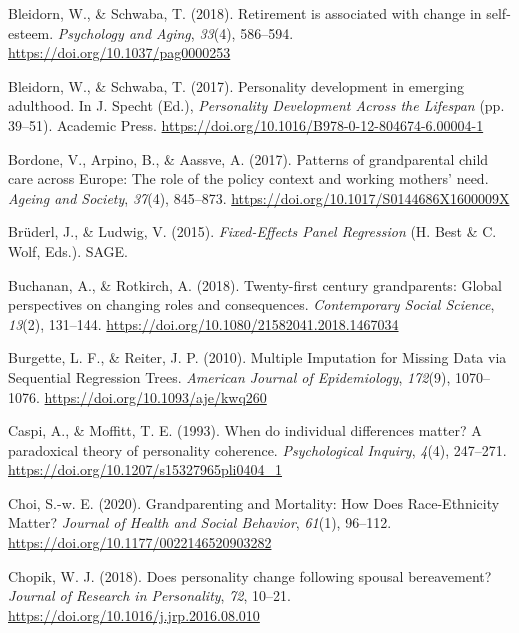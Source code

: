 \documentclass[
  english,
  man, noextraspace]{apa7}
\begin{document}
\leavevmode\hypertarget{ref-bleidornRetirementAssociatedChange2018}{}%
Bleidorn, W., \& Schwaba, T. (2018). Retirement is associated with change in self-esteem. \emph{Psychology and Aging}, \emph{33}(4), 586--594. \url{https://doi.org/10.1037/pag0000253}

\leavevmode\hypertarget{ref-bleidornPersonalityDevelopmentEmerging2017}{}%
Bleidorn, W., \& Schwaba, T. (2017). Personality development in emerging adulthood. In J. Specht (Ed.), \emph{Personality Development Across the Lifespan} (pp. 39--51). Academic Press. \url{https://doi.org/10.1016/B978-0-12-804674-6.00004-1}

\leavevmode\hypertarget{ref-bordonePatternsGrandparentalChild2017}{}%
Bordone, V., Arpino, B., \& Aassve, A. (2017). Patterns of grandparental child care across Europe: The role of the policy context and working mothers' need. \emph{Ageing and Society}, \emph{37}(4), 845--873. \url{https://doi.org/10.1017/S0144686X1600009X}

\leavevmode\hypertarget{ref-bruderlFixedEffectsPanelRegression2015}{}%
Brüderl, J., \& Ludwig, V. (2015). \emph{Fixed-Effects Panel Regression} (H. Best \& C. Wolf, Eds.). SAGE.

\leavevmode\hypertarget{ref-buchananTwentyfirstCenturyGrandparents2018}{}%
Buchanan, A., \& Rotkirch, A. (2018). Twenty-first century grandparents: Global perspectives on changing roles and consequences. \emph{Contemporary Social Science}, \emph{13}(2), 131--144. \url{https://doi.org/10.1080/21582041.2018.1467034}

\leavevmode\hypertarget{ref-burgetteMultipleImputationMissing2010}{}%
Burgette, L. F., \& Reiter, J. P. (2010). Multiple Imputation for Missing Data via Sequential Regression Trees. \emph{American Journal of Epidemiology}, \emph{172}(9), 1070--1076. \url{https://doi.org/10.1093/aje/kwq260}

\leavevmode\hypertarget{ref-caspiWhenIndividualDifferences1993}{}%
Caspi, A., \& Moffitt, T. E. (1993). When do individual differences matter? A paradoxical theory of personality coherence. \emph{Psychological Inquiry}, \emph{4}(4), 247--271. \url{https://doi.org/10.1207/s15327965pli0404_1}

\leavevmode\hypertarget{ref-choiGrandparentingMortalityHow2020}{}%
Choi, S.-w. E. (2020). Grandparenting and Mortality: How Does Race-Ethnicity Matter? \emph{Journal of Health and Social Behavior}, \emph{61}(1), 96--112. \url{https://doi.org/10.1177/0022146520903282}

\leavevmode\hypertarget{ref-chopikDoesPersonalityChange2018}{}%
Chopik, W. J. (2018). Does personality change following spousal bereavement? \emph{Journal of Research in Personality}, \emph{72}, 10--21. \url{https://doi.org/10.1016/j.jrp.2016.08.010}
\end{document}

